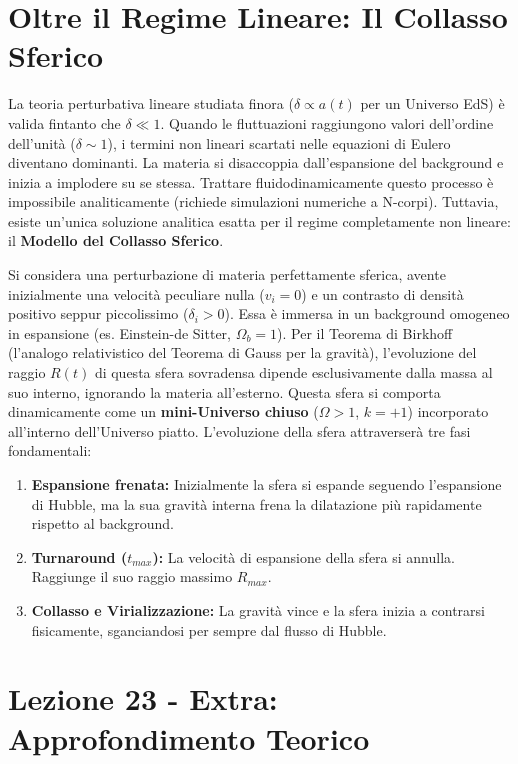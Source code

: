 \documentclass[11pt,a4paper]{report}
\begin{document}
\section{Oltre il Regime Lineare: Il Collasso Sferico}

La teoria perturbativa lineare studiata finora ($\delta \propto a(t)$ per un Universo EdS) è valida fintanto che $\delta \ll 1$. Quando le fluttuazioni raggiungono valori dell'ordine dell'unità ($\delta \sim 1$), i termini non lineari scartati nelle equazioni di Eulero diventano dominanti. La materia si disaccoppia dall'espansione del background e inizia a implodere su se stessa. 
Trattare fluidodinamicamente questo processo è impossibile analiticamente (richiede simulazioni numeriche a N-corpi). Tuttavia, esiste un'unica soluzione analitica esatta per il regime completamente non lineare: il \textbf{Modello del Collasso Sferico}.

Si considera una perturbazione di materia perfettamente sferica, avente inizialmente una velocità peculiare nulla ($v_i = 0$) e un contrasto di densità positivo seppur piccolissimo ($\delta_i > 0$). Essa è immersa in un background omogeneo in espansione (es. Einstein-de Sitter, $\Omega_b = 1$). 
Per il Teorema di Birkhoff (l'analogo relativistico del Teorema di Gauss per la gravità), l'evoluzione del raggio $R(t)$ di questa sfera sovradensa dipende esclusivamente dalla massa al suo interno, ignorando la materia all'esterno.
Questa sfera si comporta dinamicamente come un \textbf{mini-Universo chiuso} ($\Omega > 1$, $k = +1$) incorporato all'interno dell'Universo piatto. 
L'evoluzione della sfera attraverserà tre fasi fondamentali:
\begin{enumerate}
    \item \textbf{Espansione frenata:} Inizialmente la sfera si espande seguendo l'espansione di Hubble, ma la sua gravità interna frena la dilatazione più rapidamente rispetto al background.
    \item \textbf{Turnaround ($t_{max}$):} La velocità di espansione della sfera si annulla. Raggiunge il suo raggio massimo $R_{max}$.
    \item \textbf{Collasso e Virializzazione:} La gravità vince e la sfera inizia a contrarsi fisicamente, sganciandosi per sempre dal flusso di Hubble.
\end{enumerate}

\newpage
\section{Lezione 23 - Extra: Approfondimento Teorico}
\end{document}
